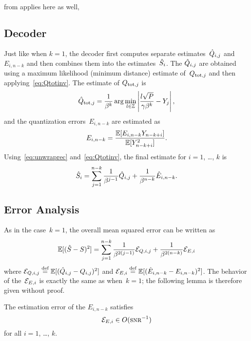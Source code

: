  from  applies here as well, 


\subsection{Decoder}

Just like when $k=1$, the decoder first computes separate estimates~$\hat{Q}_{i,j}$
and~$E_{i,n-k}$ and then combines them into the estimates~${\hat{S}}_i$. The
$\hat{Q}_{i,j}$ are obtained using a maximum likelihood (minimum distance) estimate
of~$Q_{\operatorname{tot},j}$ and then applying~\eqref{eq:Qtotinv}. The estimate of
$Q_{\operatorname{tot},j}$ is
\begin{equation*}
  \hat{Q}_{\operatorname{tot},j} = \frac{1}{\beta^k} \arg\min_{l\in\mathbb{Z}}
  \left| \frac{l\sqrt P}{\gamma \beta^k} - Y_j \right|,
\end{equation*}
and the quantization errors~$E_{i,n-k}$ are estimated as
\begin{equation*}
  E_{i,n-k} = \frac{\mathbb{E}[E_{i,n-k} Y_{n-k+i}]}{\mathbb{E}[Y_{n-k+i}^2]}.
\end{equation*}
Using~\eqref{eq:unwraprec} and~\eqref{eq:Qtotinv}, the final estimate for $i =
1$, \dots, $k$ is
\begin{equation*}
  {\hat{S}}_i = \sum_{j=1}^{n-k} \frac{1}{\beta^{j-1}} \hat{Q}_{i,j} +
  \frac{1}{\beta^{n-k}} \hat{E}_{i,n-k}.
\end{equation*}


\subsection{Error Analysis}

As in the case~$k=1$, the overall mean squared error can be written as
\begin{equation*}
  {\mathbb{E}[({\hat{S}}- S)^2]} = \sum_{j=1}^{n-k} \frac{1}{\beta^{2(j-1)}} {\mathcal{E}}_{Q,i,j} + 
  \frac{1}{\beta^{2(n-k)}} {\mathcal{E}}_{E,i}
\end{equation*}
where ${\mathcal{E}}_{Q,i,j} \stackrel{\text{def}}{=} \mathbb{E}[(\hat{Q}_{i,j} - Q_{i,j})^2]$ and ${\mathcal{E}}_{E,i} \stackrel{\text{def}}{=}
\mathbb{E}[(\hat{E}_{i,n-k} - E_{i,n-k})^2]$. The behavior of the~${\mathcal{E}}_{E,i}$ is exactly
the same as when~$k=1$; the following lemma is therefore given without proof.

\begin{lemma}
  \label{lem:Eedecayk}
  The estimation error of the $E_{i,n-k}$ satisfies
  \begin{equation*}
    \Err_{E,i} \in O(\snr^{-1})
  \end{equation*}
  for all $i = 1$, \dots, $k$. 
\end{lemma}

